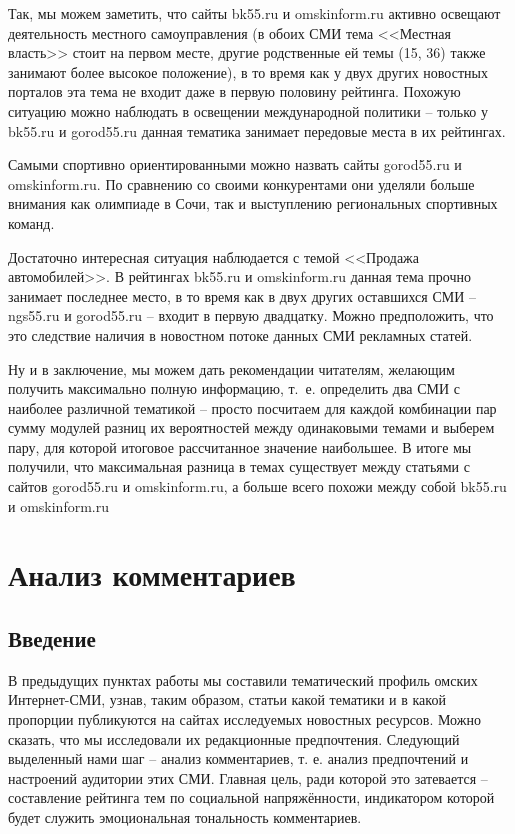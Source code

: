 Так, мы можем заметить, что сайты bk55.ru и omskinform.ru активно освещают деятельность местного самоуправления (в обоих СМИ тема <<Местная власть>> стоит на первом месте, другие родственные ей темы (15, 36) также занимают более высокое положение), в то время как у двух других новостных порталов эта тема не входит даже в первую половину рейтинга. Похожую ситуацию можно наблюдать в освещении международной политики -- только у bk55.ru и gorod55.ru данная тематика занимает передовые места в их рейтингах.

Самыми спортивно ориентированными можно назвать сайты gorod55.ru и omskinform.ru. По сравнению со своими конкурентами они уделяли больше внимания как олимпиаде в Сочи, так и выступлению региональных спортивных команд.

Достаточно интересная ситуация наблюдается с темой <<Продажа автомобилей>>. В рейтингах bk55.ru и omskinform.ru данная тема прочно занимает последнее место, в то время как в двух других оставшихся СМИ -- ngs55.ru и gorod55.ru -- входит в первую двадцатку. Можно предположить, что это следствие наличия в новостном потоке данных СМИ рекламных статей.


Ну и в заключение, мы можем дать рекомендации читателям, желающим получить максимально полную информацию, т.~е. определить два СМИ с наиболее различной тематикой -- просто посчитаем для каждой комбинации пар сумму модулей разниц их вероятностей между одинаковыми темами и выберем пару, для которой итоговое рассчитанное значение наибольшее. В итоге мы получили, что максимальная разница в темах существует между статьями с сайтов gorod55.ru и omskinform.ru, а больше всего похожи между собой bk55.ru и omskinform.ru

\begin{comment}
('bk55_preprocessed', 'gorod55')
sums 0.557354195682
('bk55_preprocessed', 'ngs55')
sums 0.567542158645
('bk55_preprocessed', 'omskinform')
sums 0.266534417882
('gorod55', 'ngs55')
sums 0.492072097932
('gorod55', 'omskinform')
sums 0.596710918679
('ngs55', 'omskinform')
sums 0.495571627246
\end{comment}

\section{Анализ комментариев}
\subsection{Введение}
В предыдущих пунктах работы мы составили тематический профиль омских Интернет-СМИ, узнав, таким образом, статьи какой тематики и в какой пропорции публикуются на сайтах исследуемых новостных ресурсов. Можно сказать, что мы исследовали их редакционные предпочтения. Следующий выделенный нами шаг -- анализ комментариев, т. е. анализ предпочтений и настроений аудитории этих СМИ. Главная цель, ради которой это затевается -- составление рейтинга тем по социальной напряжённости, индикатором которой будет служить эмоциональная тональность комментариев.

